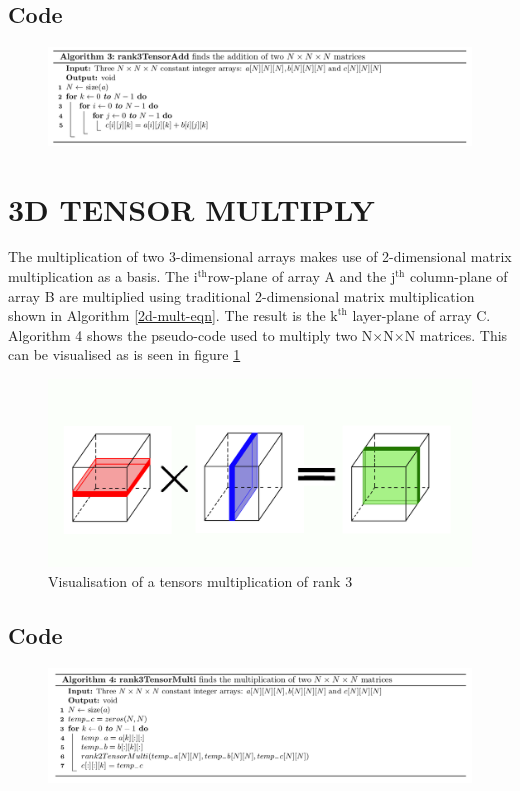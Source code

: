 \subsection{Code}
\begin{figure}[H]
\includegraphics[width=\textwidth]{build/Algo3.png}
\end{figure}
\section{3D TENSOR MULTIPLY}
The multiplication of two 3-dimensional arrays makes use of 2-dimensional matrix multiplication as a basis. The $\text{i}^\text{th}$row-plane of array A and the $\text{j}^\text{th}$ column-plane of array B are multiplied using traditional 2-dimensional matrix multiplication shown in Algorithm \ref{2d-mult-eqn}. The result is the $\text{k}^\text{th}$ layer-plane of array C. Algorithm 4 shows the pseudo-code used to multiply two N$\times$N$\times$N matrices. This can be visualised as is seen in figure \ref{3D}
\begin{figure}
\centering
\includegraphics[scale=0.5]{build/3Dmult.png}
\caption{Visualisation of a tensors multiplication of rank 3}
\label{3D}
\end{figure}
\subsection{Code}
\begin{figure}[H]
\includegraphics[width=\textwidth]{build/Algo4.png}
\end{figure}

